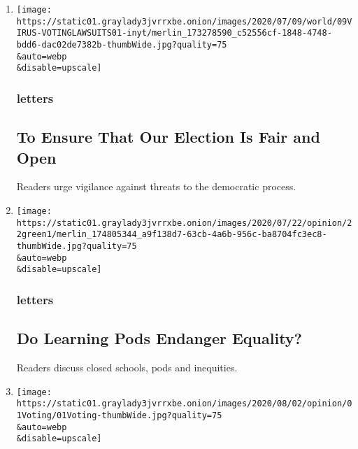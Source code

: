 \begin{enumerate}
\def\labelenumi{\arabic{enumi}.}
\item
  \href{/2020/08/02/opinion/letters/voting-election.html}{}

  \texttt{[image: https://static01.graylady3jvrrxbe.onion/images/2020/07/09/world/09VIRUS-VOTINGLAWSUITS01-inyt/merlin\_173278590\_c52556cf-1848-4748-bdd6-dac02de7382b-thumbWide.jpg?quality=75\\\&auto=webp\\\&disable=upscale]}

  \hypertarget{letters}{%
  \subsubsection{letters}\label{letters}}

  \hypertarget{to-ensure-that-our-election-is-fair-and-open}{%
  \subsection{To Ensure That Our Election Is Fair and
  Open}\label{to-ensure-that-our-election-is-fair-and-open}}

  Readers urge vigilance against threats to the democratic process.
\item
  \href{/2020/08/02/opinion/letters/virus-education.html}{}

  \texttt{[image: https://static01.graylady3jvrrxbe.onion/images/2020/07/22/opinion/22green1/merlin\_174805344\_a9f138d7-63cb-4a6b-956c-ba8704fc3ec8-thumbWide.jpg?quality=75\\\&auto=webp\\\&disable=upscale]}

  \hypertarget{letters-1}{%
  \subsubsection{letters}\label{letters-1}}

  \hypertarget{do-learning-pods-endanger-equality}{%
  \subsection{Do Learning Pods Endanger
  Equality?}\label{do-learning-pods-endanger-equality}}

  Readers discuss closed schools, pods and inequities.
\item
  \href{/2020/08/01/opinion/sunday/mail-voting-covid-2020-election.html}{}

  \texttt{[image: https://static01.graylady3jvrrxbe.onion/images/2020/08/02/opinion/01Voting/01Voting-thumbWide.jpg?quality=75\\\&auto=webp\\\&disable=upscale]}


\end{enumerate}
